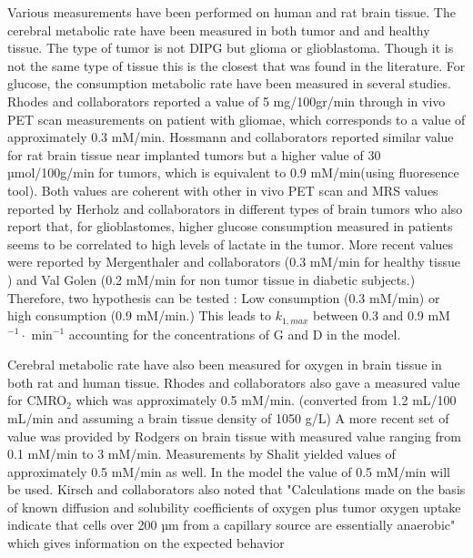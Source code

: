 \documentclass[11pt,a4paper]{article}
\begin{document}
Various measurements have been performed on human and rat brain tissue. The cerebral metabolic rate have been measured in both tumor and and healthy tissue. The type of tumor is not DIPG but glioma or glioblastoma. Though it is not the same type of tissue this is the closest that was found in the literature. For glucose, the consumption metabolic rate have been measured in several studies. Rhodes and collaborators reported a value of 5 mg/100gr/min through in vivo PET scan measurements on patient with gliomae, which corresponds to a value of approximately 0.3 mM/min.\cite{Rhodes1983} Hossmann and collaborators reported similar value for rat brain tissue near implanted tumors but a higher value of 30 µmol/100g/min for tumors, which is equivalent to  0.9 mM/min(using fluoresence tool).\cite{Hossmann1986} Both values are coherent with other in vivo PET scan and MRS values reported by Herholz and collaborators in different types of brain tumors who also report that, for glioblastomes, higher glucose consumption measured in patients seems to be correlated to high levels of lactate in the tumor.\cite{Herholz1992} More recent values were reported by Mergenthaler and collaborators (0.3 mM/min for healthy tissue \cite{Mergenthaler2013}) and Val Golen (0.2 mM/min for non tumor tissue in diabetic subjects.) Therefore, two hypothesis can be tested : Low consumption (0.3 mM/min) or high consumption (0.9 mM/min.) This leads to $k_{1,max}$ between 0.3 and 0.9 mM$^{-1}\cdot$ min$^{-1}$ accounting for the concentrations of G and D in the model.


Cerebral metabolic rate have also been measured for oxygen in brain tissue in both rat and human tissue. Rhodes and collaborators also gave a measured value for CMRO$_2$ which was approximately 0.5 mM/min. (converted from 1.2 mL/100 mL/min and assuming a brain tissue density of 1050 g/L) \cite{Rhodes1983} A more recent set of value was provided by Rodgers on brain tissue with measured value ranging from 0.1 mM/min to 3 mM/min. Measurements by Shalit yielded values of approximately 0.5 mM/min as well.\cite{Shalit1972} In the model the value of 0.5 mM/min will be used. Kirsch and collaborators also noted that  "Calculations made on the basis of known diffusion and solubility coefficients of oxygen plus tumor oxygen uptake indicate that cells over 200 µm from a capillary source are essentially anaerobic" which gives information on the expected behavior \cite{Kirsch1978}
\end{document}
